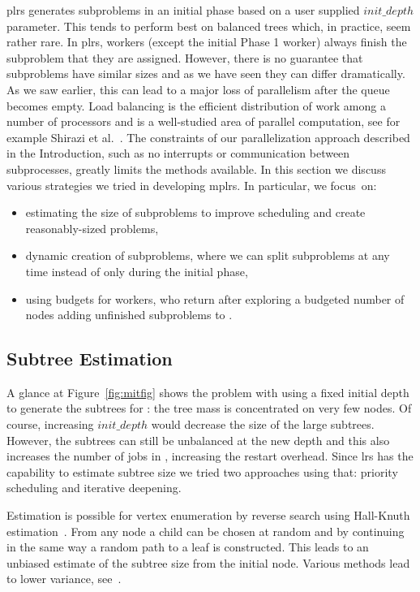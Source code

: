\documentclass[a4paper,11pt]{article}   \usepackage{authblk} \usepackage[top=1.9cm,bottom=1.9cm,left=1.9cm,right=1.9cm]{geometry}
\newcommand{\progname}{\textsf}
\newcommand{\lrs}{\progname{lrs}\xspace}
\newcommand{\plrs}{\progname{plrs}\xspace}
\newcommand{\mplrs}{\progname{mplrs}\xspace}
\newcommand{\initdepth}{\ensuremath{\mathit{init\_depth}}\xspace}
\begin{document}
\label{sec:par}
\plrs generates subproblems
in an initial phase 
based on a user supplied \initdepth parameter.  This tends to perform best
on balanced trees which, in practice, seem rather rare.
In \plrs, workers (except the initial Phase 1 worker) always
finish the subproblem that they are assigned.  However, there is
no guarantee that subproblems have similar sizes and as we have seen 
they can differ dramatically.  As we saw earlier, this can lead to a major loss of parallelism
after the queue  becomes empty. 
Load balancing is the efficient distribution of work among a number of processors and is 
a well-studied area of parallel computation, see for example Shirazi et al.~\cite{SLB}.
The constraints of our parallelization approach described in the Introduction, such as no
interrupts or communication between subprocesses, greatly limits the methods available.
In this section we discuss various strategies we tried in developing \mplrs.
In particular, we focus~on:
\begin{itemize}
 \item estimating the size of subproblems to 
improve scheduling and create reasonably-sized problems,
 \item dynamic creation of subproblems, where we
can split subproblems at any time instead of only during the initial phase,
 \item using budgets for workers, who return after exploring
a budgeted number of nodes adding unfinished subproblems to .
\end{itemize}

\subsection{Subtree Estimation}
\label{subsec:subtree}
A glance at Figure~\ref{fig:mitfig} shows the problem with
using a fixed initial depth to generate the subtrees for :
the tree mass is concentrated on very few nodes. Of course,
increasing \initdepth would decrease the size of the large subtrees.
However, the subtrees can still be unbalanced at the new depth and
this also increases the number of jobs in 
, increasing the restart overhead. Since \lrs has
the capability to estimate subtree size we tried two approaches using that: 
priority scheduling and iterative deepening.

Estimation is possible for
vertex enumeration by reverse
search using Hall-Knuth estimation~\cite{HK}.
From any node a child can be chosen at random and by continuing
in the same way a random path to a leaf is constructed. This leads
to an unbiased estimate of the subtree size from the initial node.
Various methods lead to lower variance, see~\cite{AD00}. 
\end{document}
